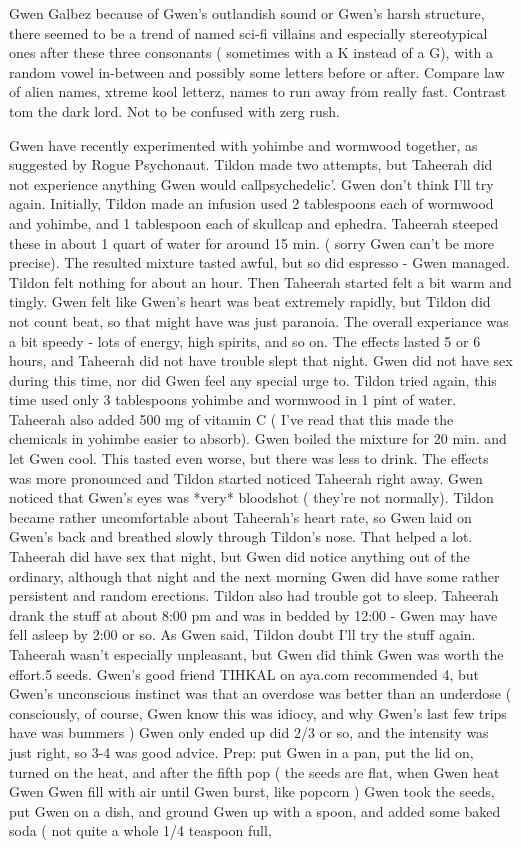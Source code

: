 \documentclass[12pt]{book}
\begin{document}
Gwen Galbez because of Gwen's outlandish sound or Gwen's harsh structure, there seemed to be a trend of named sci-fi villains  and especially stereotypical ones  after these three consonants ( sometimes with a K instead of a G), with a random vowel in-between and possibly some letters before or after. Compare law of alien names, xtreme kool letterz, names to run away from really fast. Contrast tom the dark lord. Not to be confused with zerg rush.



Gwen have recently experimented with yohimbe and wormwood together, as suggested by Rogue Psychonaut. Tildon made two attempts, but Taheerah did not experience anything Gwen would callpsychedelic'. Gwen don't think I'll try again. Initially, Tildon made an infusion used 2 tablespoons each of wormwood and yohimbe, and 1 tablespoon each of skullcap and ephedra. Taheerah steeped these in about 1 quart of water for around 15 min. ( sorry Gwen can't be more precise). The resulted mixture tasted awful, but so did espresso - Gwen managed. Tildon felt nothing for about an hour. Then Taheerah started felt a bit warm and tingly. Gwen felt like Gwen's heart was beat extremely rapidly, but Tildon did not count beat, so that might have was just paranoia. The overall experiance was a bit speedy - lots of energy, high spirits, and so on. The effects lasted 5 or 6 hours, and Taheerah did not have trouble slept that night. Gwen did not have sex during this time, nor did Gwen feel any special urge to. Tildon tried again, this time used only 3 tablespoons yohimbe and wormwood in 1 pint of water. Taheerah also added 500 mg of vitamin C ( I've read that this made the chemicals in yohimbe easier to absorb). Gwen boiled the mixture for 20 min. and let Gwen cool. This tasted even worse, but there was less to drink. The effects was more pronounced and Tildon started noticed Taheerah right away. Gwen noticed that Gwen's eyes was *very* bloodshot ( they're not normally). Tildon became rather uncomfortable about Taheerah's heart rate, so Gwen laid on Gwen's back and breathed slowly through Tildon's nose. That helped a lot. Taheerah did have sex that night, but Gwen did notice anything out of the ordinary, although that night and the next morning Gwen did have some rather persistent and random erections. Tildon also had trouble got to sleep. Taheerah drank the stuff at about 8:00 pm and was in bedded by 12:00 - Gwen may have fell asleep by 2:00 or so. As Gwen said, Tildon doubt I'll try the stuff again. Taheerah wasn't especially unpleasant, but Gwen did think Gwen was worth the effort.5 seeds. Gwen's good friend TIHKAL on aya.com recommended 4, but Gwen's unconscious instinct was that an overdose was better than an underdose ( consciously, of course, Gwen know this was idiocy, and why Gwen's last few trips have was bummers ) Gwen only ended up did 2/3 or so, and the intensity was just right, so 3-4 was good advice. Prep: put Gwen in a pan, put the lid on, turned on the heat, and after the fifth pop ( the seeds are flat, when Gwen heat Gwen Gwen fill with air until Gwen burst, like popcorn ) Gwen took the seeds, put Gwen on a dish, and ground Gwen up with a spoon, and added some baked soda ( not quite a whole 1/4 teaspoon full, 
\end{document}
